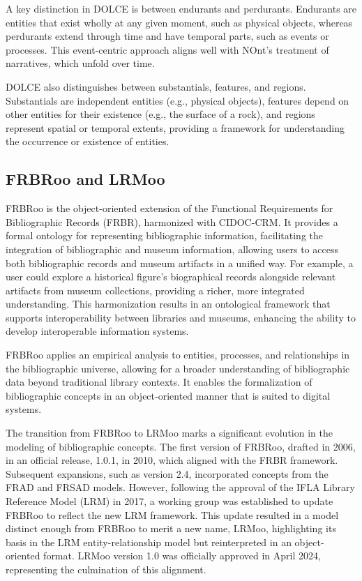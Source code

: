 A key distinction in DOLCE is between endurants and perdurants. Endurants are entities that exist wholly at any given moment, such as physical objects, whereas perdurants extend through time and have temporal parts, such as events or processes. This event-centric approach aligns well with NOnt's treatment of narratives, which unfold over time.

DOLCE also distinguishes between substantials, features, and regions. Substantials are independent entities (e.g., physical objects), features depend on other entities for their existence (e.g., the surface of a rock), and regions represent spatial or temporal extents, providing a framework for understanding the occurrence or existence of entities.

\subsection{FRBRoo and LRMoo}\label{III-subsec:frbroo}

FRBRoo \cite{doerrFRBROOCONCEPTUALMODEL2008} is the object-oriented extension of the Functional Requirements for Bibliographic Records (FRBR), harmonized with CIDOC-CRM. It provides a formal ontology for representing bibliographic information, facilitating the integration of bibliographic and museum information, allowing users to access both bibliographic records and museum artifacts in a unified way. For example, a user could explore a historical figure's biographical records alongside relevant artifacts from museum collections, providing a richer, more integrated understanding. This harmonization results in an ontological framework that supports interoperability between libraries and museums, enhancing the ability to develop interoperable information systems.

FRBRoo applies an empirical analysis to entities, processes, and relationships in the bibliographic universe, allowing for a broader understanding of bibliographic data beyond traditional library contexts. It enables the formalization of bibliographic concepts in an object-oriented manner that is suited to digital systems. 

The transition from FRBRoo to LRMoo \cite{rivaLRMooHighlevelModel2022} marks a significant evolution in the modeling of bibliographic concepts. The first version of FRBRoo, drafted in 2006, \culminated in an official release, 1.0.1, in 2010, which aligned with the FRBR framework. Subsequent expansions, such as version 2.4, incorporated concepts from the FRAD and FRSAD models. However, following the approval of the IFLA Library Reference Model (LRM) in 2017\cite{groupIFLALibraryReference2018}, a working group was established to update FRBRoo to reflect the new LRM framework. This update resulted in a model distinct enough from FRBRoo to merit a new name, LRMoo, highlighting its basis in the LRM entity-relationship model but reinterpreted in an object-oriented format. LRMoo version 1.0 was officially approved in April 2024, representing the culmination of this alignment.

